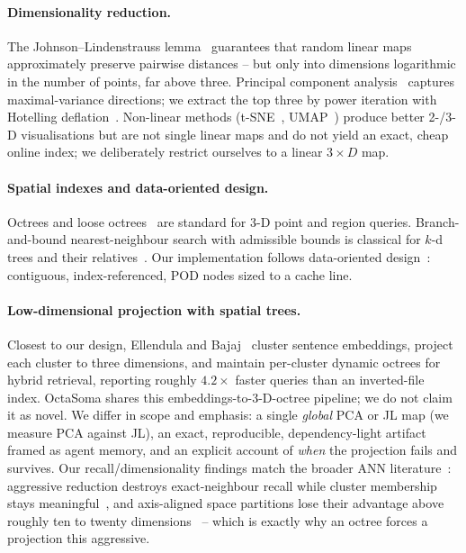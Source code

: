 \documentclass[11pt]{article}
\begin{document}
\paragraph{Dimensionality reduction.} The Johnson--Lindenstrauss
lemma~\cite{jl} guarantees that random linear maps approximately preserve pairwise
distances -- but only into dimensions logarithmic in the number of points, far
above three. Principal component analysis~\cite{pca} captures maximal-variance
directions; we extract the top three by power iteration with Hotelling
deflation~\cite{golubvanloan}. Non-linear methods (t-SNE~\cite{tsne},
UMAP~\cite{umap}) produce better 2-/3-D visualisations but are not single linear
maps and do not yield an exact, cheap online index; we deliberately restrict
ourselves to a linear $3\times D$ map.

\paragraph{Spatial indexes and data-oriented design.} Octrees and loose
octrees~\cite{octree,ulrich} are standard for 3-D point and region queries.
Branch-and-bound nearest-neighbour search with admissible bounds is classical for
$k$-d trees and their relatives~\cite{friedman}. Our implementation follows
data-oriented design~\cite{dod}: contiguous, index-referenced, POD nodes sized to
a cache line.

\paragraph{Low-dimensional projection with spatial trees.} Closest to our design,
Ellendula and Bajaj~\cite{octreerag} cluster sentence embeddings, project each
cluster to three dimensions, and maintain per-cluster dynamic octrees for hybrid
retrieval, reporting roughly $4.2\times$ faster queries than an inverted-file
index. OctaSoma shares this embeddings-to-3-D-octree pipeline; we do not claim it
as novel. We differ in scope and emphasis: a single \emph{global} PCA or JL map
(we measure PCA against JL), an exact, reproducible, dependency-light artifact
framed as agent memory, and an explicit account of \emph{when} the projection
fails and survives. Our recall/dimensionality findings match the broader ANN
literature~\cite{drsurvey}: aggressive reduction destroys exact-neighbour recall
while cluster membership stays meaningful~\cite{nnmeaning}, and axis-aligned space
partitions lose their advantage above roughly ten to twenty
dimensions~\cite{highdimann} -- which is exactly why an octree forces a projection
this aggressive.
\end{document}
